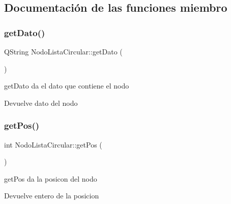 \subsection{Documentación de las funciones miembro}
\mbox{\label{class_nodo_lista_circular_a37393a1f2c117891206678387d2a9837}} 
\subsubsection{\texorpdfstring{get\+Dato()}{getDato()}}
{\footnotesize\ttfamily Q\+String Nodo\+Lista\+Circular\+::get\+Dato (\begin{DoxyParamCaption}{ }\end{DoxyParamCaption})\hspace{0.3cm}{\ttfamily [inline]}}



get\+Dato da el dato que contiene el nodo 

\begin{DoxyReturn}{Devuelve}
dato del nodo 
\end{DoxyReturn}
\mbox{\label{class_nodo_lista_circular_a5e835714bbc78795e50e6c76a3157ff4}} 
\subsubsection{\texorpdfstring{get\+Pos()}{getPos()}}
{\footnotesize\ttfamily int Nodo\+Lista\+Circular\+::get\+Pos (\begin{DoxyParamCaption}{ }\end{DoxyParamCaption})\hspace{0.3cm}{\ttfamily [inline]}}



get\+Pos da la posicon del nodo 

\begin{DoxyReturn}{Devuelve}
entero de la posicion 
\end{DoxyReturn}
\mbox{\label{class_nodo_lista_circular_a3f2bd335e477f76dfcb2417686ca6296}} 
